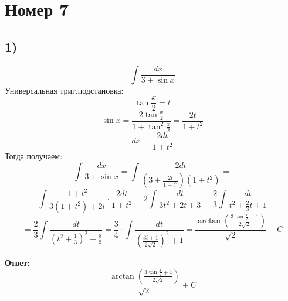 \documentclass[a4paper,12pt]{article}
\begin{document}
\section*{Номер 7}
\subsection*{1)}
\[
\int \frac{dx}{3 + \sin x}
\]
Универсальная триг.подстановка:
\[
\tan \frac{x}{2} = t
\]
\[
\sin x = \frac{ 2 \tan \frac{x}{2}}{1 + \tan^2 \frac{x}{2}} = \frac{2t}{1 + t^2}
\]
\[
dx = \frac{2dt}{1 + t^2}
\]
Тогда получаем:
\[
\int \frac{dx}{3 + \sin x} =  \int \frac{2dt}{(3 + \frac{2t}{1 + t^2})(1+t^2)} = 
\]
\[
=\int  \frac{1+t^2}{3(1+t^2) + 2t} \cdot \frac{2dt}{1+t^2} = 2 \int \frac{dt}{3t^2 + 2t + 3} = \frac{2}{3} \int \frac{dt}{t^2 + \frac{2}{3}t + 1} = 
\]
\[
=
\frac{2}{3} \int \frac{dt}{(t^2 + \frac{1}{3})^2 + \frac{8}{9}}   = \frac{3}{4} \cdot \int \frac{dt}{\left( \frac{3t+1}{2\sqrt{2}}\right)^2 + 1}= \frac{\arctan \left(\frac{3 \tan \frac{x}{2} + 1}{2\sqrt{2}}\right)}{\sqrt{2}} + C
\]
\begin{center}
\textbf{Ответ: } \[ \frac{\arctan \left(\frac{3 \tan \frac{x}{2} + 1}{2\sqrt{2}}\right)}{\sqrt{2}} + C\]
\end{center}
\end{document}
